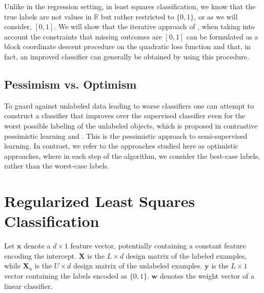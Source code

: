 \documentclass[conference,a4paper,10pt]{IEEEtran}\usepackage[]{graphicx}\usepackage[]{color}
\begin{document}

Unlike in the regression setting, in least squares classification, we know that the true labels are not values in $\mathbb{R}$ but rather restricted to $\{0,1\}$, or as we will consider, $[0,1]$. We will show that the iterative approach of \cite{Healy1956}, when taking into account the constraints that missing outcomes are $[0,1]$ can be formulated as a block coordinate descent procedure on the quadratic loss function and that, in fact, an improved classifier can generally be obtained by using this procedure.

\subsection{Pessimism vs. Optimism}
To guard against unlabeled data leading to worse classifiers one can attempt to construct a classifier that improves over the supervised classifier even for the worst possible labeling of the unlabeled objects, which is proposed in contrastive pessimistic learning \cite{Loog2016} and \cite{Krijthe2015}. This is the pessimistic approach to semi-supervised learning. In contrast, we refer to the approaches studied here as optimistic approaches, where in each step of the algorithm, we consider the best-case labels, rather than the worst-case labels.

\section{Regularized Least Squares Classification}
Let $\mathbf{x}$ denote a $d\times 1$ feature vector, potentially containing a constant feature encoding the intercept.
$\mathbf{X}$ is the $L \times d$ design matrix of the labeled examples, while $\mathbf{X}_\text{u}$ is the  $U \times d$ design matrix of the unlabeled examples. $\mathbf{y}$ is the $L\times 1$ vector containing the labels encoded as $\{0,1\}$.
$\mathbf{w}$ denotes the weight vector of a linear classifier.
\end{document}
